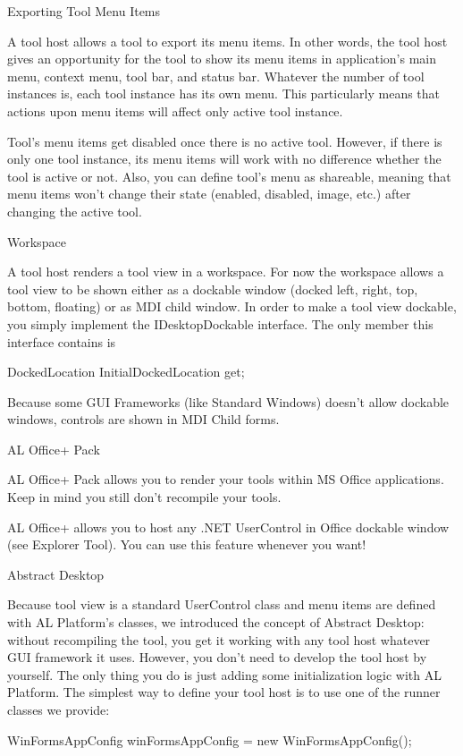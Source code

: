 Exporting Tool Menu Items

A tool host allows a tool to export its menu items. In other words, the tool host gives an opportunity for the tool to show its menu items in application's main menu, context menu, tool bar, and status bar. Whatever the number of tool instances is, each tool instance has its own menu. This particularly means that actions upon menu items will affect only active tool instance. 

Tool's menu items get disabled once there is no active tool. However, if there is only one tool instance, its menu items will work with no difference whether the tool is active or not. Also, you can define tool's menu as shareable, meaning that menu items won't change their state (enabled, disabled, image, etc.) after changing the active tool. 

Workspace

A tool host renders a tool view in a workspace. For now the workspace allows a tool view to be shown either as a dockable window (docked left, right, top, bottom, floating) or as MDI child window. In order to make a tool view dockable, you simply implement the IDesktopDockable interface. The only member this interface contains is 

DockedLocation InitialDockedLocation { get; } 

Because some GUI Frameworks (like Standard Windows) doesn't allow dockable windows, controls are shown in MDI Child forms. 

AL Office+ Pack

AL Office+ Pack allows you to render your tools within MS Office applications. Keep in mind you still don't recompile your tools.

AL Office+ allows you to host any .NET UserControl in Office dockable window (see Explorer Tool). You can use this feature whenever you want! 

Abstract Desktop

Because tool view is a standard UserControl class and menu items are defined with AL Platform's classes, we introduced the concept of Abstract Desktop: without recompiling the tool, you get it working with any tool host whatever GUI framework it uses. However, you don't need to develop the tool host by yourself. The only thing you do is just adding some initialization logic with AL Platform. The simplest way to define your tool host is to use one of the runner classes we provide:

WinFormsAppConfig winFormsAppConfig = new WinFormsAppConfig();

